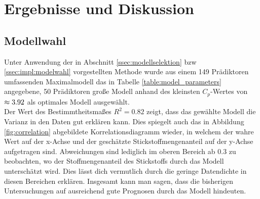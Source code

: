 \section{Ergebnisse und Diskussion}
\label{sec:discuss}

\subsection{Modellwahl}
\label{ssec:discuss:modelselect}
Unter Anwendung der in Abschnitt \ref{ssec:modellselektion} bzw \ref{ssec:impl:modelwahl} vorgestellten Methode wurde aus einem 149 Prädiktoren umfassenden Maximalmodell das in Tabelle \ref{table:model_parameters} angegebene, 50 Prädiktoren große Modell anhand des kleinsten $C_p$-Wertes von $\mathrm{\approx3.92}$ als optimales Modell ausgewählt.\\

Der Wert des Bestimmtheitsmaßes $R^2 = 0.82$ zeigt, dass das gewählte Modell die Varianz in den Daten gut erklären kann. Dies spiegelt auch das in Abbildung \ref{fig:correlation} abgebildete Korrelationsdiagramm wieder, in welchem der wahre Wert auf der x-Achse und der geschätzte Stickstoffmengenanteil auf der y-Achse aufgetragen sind.
Abweichungen sind lediglich im oberen Bereich ab $0.3$ zu beobachten, wo der Stoffmengenanteil des Stickstoffs durch das Modell unterschätzt wird.
Dies lässt dich vermutlich durch die geringe Datendichte in diesen Bereichen erklären.
Insgesamt kann man sagen, dass die bisherigen Untersuchungen auf ausreichend gute Prognosen durch das Modell hindeuten.

